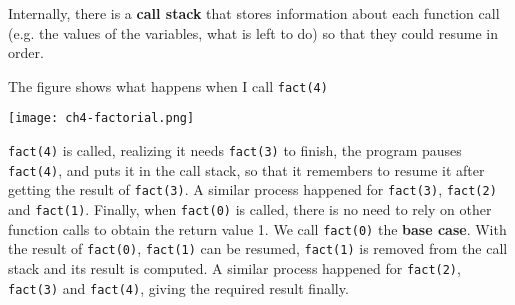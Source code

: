 Internally, there is a \textbf{call stack} that stores information about each function call (e.g. the values of the variables, what is left to do) so that they could resume in order.

The figure shows what happens when I call \texttt{fact(4)}

\texttt{[image: ch4-factorial.png]}

\texttt{fact(4)} is called, realizing it needs \texttt{fact(3)} to finish, the program pauses \texttt{fact(4)}, and puts it in the call stack, so that it remembers to resume it after getting the result of \texttt{fact(3)}. A similar process happened for \texttt{fact(3)}, \texttt{fact(2)} and \texttt{fact(1)}. Finally, when \texttt{fact(0)} is called, there is no need to rely on other function calls to obtain the return value 1. We call \texttt{fact(0)} the \textbf{base case}. With the result of \texttt{fact(0)}, \texttt{fact(1)} can be resumed, \texttt{fact(1)} is removed from the call stack and its result is computed. A similar process happened for \texttt{fact(2)}, \texttt{fact(3)} and \texttt{fact(4)}, giving the required result finally.

